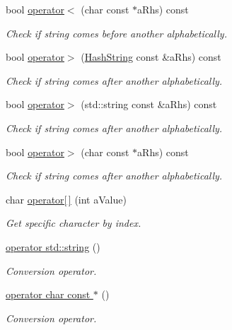 \begin{DoxyCompactItemize}
bool \hyperlink{classHashString_a2d89eb1021b9e474563c005769617adb}{operator$<$} (char const $\ast$a\+Rhs) const 
\begin{DoxyCompactList}\small\item\em Check if string comes before another alphabetically. \end{DoxyCompactList}\item 
bool \hyperlink{classHashString_ab7ddccf351387db625efb4653d736558}{operator$>$} (\hyperlink{classHashString}{Hash\+String} const \&a\+Rhs) const 
\begin{DoxyCompactList}\small\item\em Check if string comes after another alphabetically. \end{DoxyCompactList}\item 
bool \hyperlink{classHashString_a48be5d2faf89086c2e99b3a078c43b31}{operator$>$} (std\+::string const \&a\+Rhs) const 
\begin{DoxyCompactList}\small\item\em Check if string comes after another alphabetically. \end{DoxyCompactList}\item 
bool \hyperlink{classHashString_a73c53fca70ccda361b044e452271f5ca}{operator$>$} (char const $\ast$a\+Rhs) const 
\begin{DoxyCompactList}\small\item\em Check if string comes after another alphabetically. \end{DoxyCompactList}\item 
char \hyperlink{classHashString_a9416da948d83adcf3ca1ad67670366b8}{operator\mbox{[}$\,$\mbox{]}} (int a\+Value)
\begin{DoxyCompactList}\small\item\em Get specific character by index. \end{DoxyCompactList}\item 
\hyperlink{classHashString_abd20346f2111534ad014c4bbe4e8696d}{operator std\+::string} ()
\begin{DoxyCompactList}\small\item\em Conversion operator. \end{DoxyCompactList}\item 
\hyperlink{classHashString_a4dac36a453e5f8ee703bca1e0bcf7215}{operator char const $\ast$} ()
\begin{DoxyCompactList}\small\item\em Conversion operator. \end{DoxyCompactList}\item 

\end{DoxyCompactItemize}
